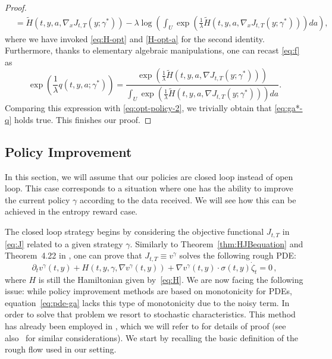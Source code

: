 \documentclass[12pt,reqno]{amsart}
\numberwithin{equation}{section}  %
\newcommand{\1}{{\bf 1}}
\newcommand{\2}{{\bf 2}}
\newcommand{\ga}{\gamma}
\newcommand{\la}{\lambda}
\newcommand{\si}{\sigma}
\newcommand{\lp}{\left(}
\newcommand{\rp}{\right)}
\theoremstyle{remark}
\theoremstyle{remark}
\newcommand{\beq}{\begin{equation}}
\newcommand{\eeq}{\end{equation}}
\begin{document}
\begin{proof}
\begin{align}
&= \tilde{H}(t,y,a,\nabla_x J_{t,T}(y; \ga^{\ast})) - \la \log \lp \int_U \exp\lp \frac{1}{\la} \tilde{H}(t,y,a,\nabla_x J_{t,T}(y;\ga^{\ast})) \rp da \rp,
\end{align}
where we have invoked \eqref{eq:H-opt} and \eqref{H-opt-a} for the second identity.
Furthermore, thanks to elementary algebraic manipulations, one can recast \eqref{eq:f} as 
$$
\exp \lp \dfrac{1}{\lambda} q(t,y,a;\ga^{\ast}) \rp 
=
\dfrac{\exp\lp \frac{1}{\la} \tilde H (t, y, a, \nabla J_{t,T}(y; \ga^{\ast})) \rp}{\int_U \exp\lp \frac{1}{\la} \tilde H (t, y, a, \nabla J_{t,T}(y; \ga^{\ast})) \rp da} .
$$
Comparing this expression with \eqref{eq:opt-policy-2}, we trivially obtain that \eqref{eq:ga*-q} holds true. This finishes our proof.
\end{proof}

\subsection{Policy Improvement}\label{sec:closed-loop}

In this section, we will assume that our policies are closed loop instead of open loop. This case corresponds to a situation where one has the ability to improve the current policy $\ga$ according to the data received. We will see how this can be achieved in the entropy reward case.

The closed loop strategy begins by considering the objective functional $J_{t,T} $ in \eqref{eq:J} related to a given strategy $\ga$. Similarly to Theorem~\ref{thm:HJBequation} and Theorem~4.22 in \cite{CHT}, one can prove that $J_{t,T} \equiv v^{\ga}$ solves the following rough PDE:
\beq\label{eq:pde-ga}
\partial_t v^{\ga}(t,y) + H(t, y, \ga, \nabla v^{\ga}(t,y)) + \nabla v^{\ga}(t,y) \cdot \si(t,y) \dot{\zeta}_t = 0 \, ,
\eeq
where $H$ is still the Hamiltonian given by~\eqref{eq:H}.
We are now facing the following issue: while policy improvement methods are based on monotonicity for PDEs, equation~\eqref{eq:pde-ga} lacks this type of monotonicity due to the noisy term. In order to solve that problem we resort to stochastic characteristics. This method has already been employed in \cite{CHT}, which we will refer to for details of proof (see also~\cite{CFO} for similar considerations). We start by recalling the basic definition of the rough flow used in our setting.
\end{document}
